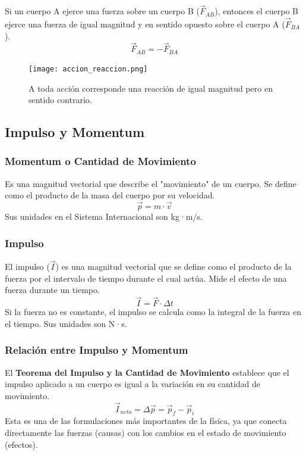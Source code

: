 \documentclass[11pt]{article}
\begin{document}
Si un cuerpo A ejerce una fuerza sobre un cuerpo B ($\vec{F}_{AB}$), entonces el cuerpo B ejerce una fuerza de igual magnitud y en sentido opuesto sobre el cuerpo A ($\vec{F}_{BA}$).
\[ \vec{F}_{AB} = - \vec{F}_{BA} \]

\begin{figure}[h!]
	\centering
	\texttt{[image: accion\_reaccion.png]}
	\caption{A toda acción corresponde una reacción de igual magnitud pero en sentido contrario.}
\end{figure}

\subsection{Impulso y Momentum}
\subsubsection{Momentum o Cantidad de Movimiento}
Es una magnitud vectorial que describe el "movimiento" de un cuerpo. Se define como el producto de la masa del cuerpo por su velocidad.
\[ \vec{p} = m \cdot \vec{v} \]
Sus unidades en el Sistema Internacional son kg·m/s.

\subsubsection{Impulso}
El impulso ($\vec{I}$) es una magnitud vectorial que se define como el producto de la fuerza por el intervalo de tiempo durante el cual actúa. Mide el efecto de una fuerza durante un tiempo.
\[ \vec{I} = \vec{F} \cdot \Delta t \]
Si la fuerza no es constante, el impulso se calcula como la integral de la fuerza en el tiempo. Sus unidades son N·s.

\subsubsection{Relación entre Impulso y Momentum}
El \textbf{Teorema del Impulso y la Cantidad de Movimiento} establece que el impulso aplicado a un cuerpo es igual a la variación en su cantidad de movimiento.
\[ \vec{I}_{neto} = \Delta \vec{p} = \vec{p}_f - \vec{p}_i \]
Esta es una de las formulaciones más importantes de la física, ya que conecta directamente las fuerzas (causas) con los cambios en el estado de movimiento (efectos).
\end{document}
